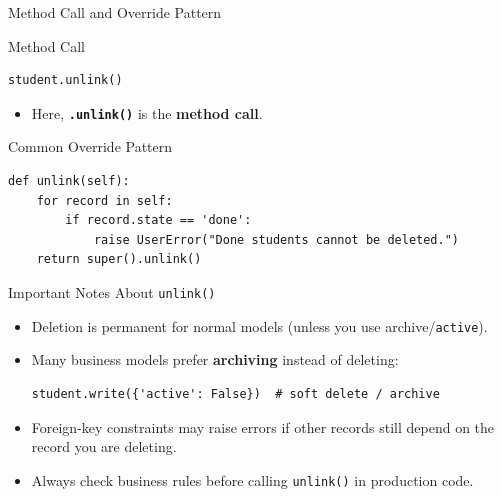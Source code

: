 \begin{frame}[fragile]{Method Call and Override Pattern}
\begin{block}{Method Call}
\begin{lstlisting}
student.unlink()
\end{lstlisting}
	\begin{itemize}
		\item Here, \textbf{\texttt{.unlink()}} is the \textbf{method call}.
	\end{itemize}
\end{block}
\begin{block}{Common Override Pattern}
\begin{lstlisting}
def unlink(self):
	for record in self:
		if record.state == 'done':
			raise UserError("Done students cannot be deleted.")
	return super().unlink()
\end{lstlisting}
\end{block}
\end{frame}

\begin{frame}[fragile]{Important Notes About \texttt{unlink()}}
	\begin{itemize}
		\item Deletion is permanent for normal models (unless you use archive/\texttt{active}).
		\item Many business models prefer \textbf{archiving} instead of deleting:
\begin{lstlisting}
student.write({'active': False})  # soft delete / archive
\end{lstlisting}
		\item Foreign-key constraints may raise errors if other records still depend on the record you are deleting.
		\item Always check business rules before calling \texttt{unlink()} in production code.
	\end{itemize}
\end{frame}

